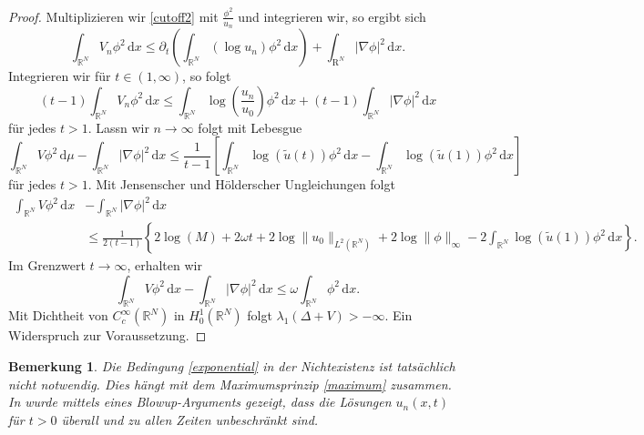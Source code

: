 \documentclass[11pt]{article}
\theoremstyle{break}
\newtheorem{nt}[thm]{Bemerkung}
\begin{document}
\begin{proof}
Multiplizieren wir \eqref{cutoff2} mit $\frac{\phi^2}{u_n}$ und integrieren wir, so ergibt sich
\begin{equation}
\int_{\mathbb R^N} V_n \phi^2\, \mathrm dx \le \partial_t \left ( \int_{\mathbb R^N} (\log u_n) \phi^2\, \mathrm dx \right )+ \int_{\mathrm R^N} |\nabla \phi|^2\, \mathrm dx.
\end{equation}
Integrieren wir f\"ur $t\in (1,\infty)$, so folgt
\begin{equation}
(t-1) \int_{\mathbb R^N} V_n \phi^2\, \mathrm dx \le \int_{\mathbb R^N} \log \left ( \frac{u_n}{u_0} \right )\phi^2\, \mathrm dx + (t-1) \int_{\mathbb R^N}|\nabla \phi|^2\, \mathrm dx
\end{equation}
für jedes $t>1$. Lassn wir $n\to \infty$ folgt mit Lebesgue
\begin{equation}
\int_{\mathbb R^N} V\phi^2 \, \mathrm d\mu - \int_{\mathbb R^N} |\nabla \phi|^2 \, \mathrm dx \le \frac{1}{t-1} \left [ \int_{\mathbb R^N} \log(\tilde u(t)) \phi^2 \, \mathrm dx -\int_{\mathbb R^N} \log(\tilde u(1))\phi^2\, \mathrm dx \right ]
\end{equation}
für jedes $t>1$. Mit Jensenscher und Hölderscher Ungleichungen folgt
\begin{align*}
\int_{\mathbb R^N} V\phi^2 \, \mathrm dx &- \int_{\mathbb R^N} |\nabla \phi|^2\, \mathrm dx \\ &\le  \frac{1}{2(t-1)} \left \{ 2\log(M) + 2\omega t + 2\log\|u_0\|_{L^2(\mathbb R^N)} + 2 \log \|\phi\|_\infty - 2\int_{\mathbb R^N} \log(\tilde u(1))\phi^2\, \mathrm dx \right \}.
\end{align*}
Im Grenzwert $t\to \infty$, erhalten wir
\begin{equation}
\int_{\mathbb R^N} V\phi^2\, \mathrm dx - \int_{\mathbb R^N} |\nabla \phi|^2\, \mathrm dx \le \omega \int_{\mathbb R^N} \phi^2\, \mathrm dx.
\end{equation}
Mit Dichtheit von $C_c^\infty(\mathbb R^N)$ in $H_0^1(\mathbb R^N)$ folgt $\lambda_1(\Delta +V) >-\infty$. Ein Widerspruch zur Voraussetzung.
\end{proof}
\begin{nt}\label{bem}
Die Bedingung \eqref{exponential} in der Nichtexistenz ist tatsächlich nicht notwendig. Dies hängt mit dem Maximumsprinzip \eqref{maximum} zusammen. In \cite{baras-goldstein} wurde mittels eines Blowup-Arguments gezeigt, dass die Lösungen $u_n(x,t)$ für $t>0$ überall und zu allen Zeiten unbeschränkt sind.
\end{nt}
\end{document}
